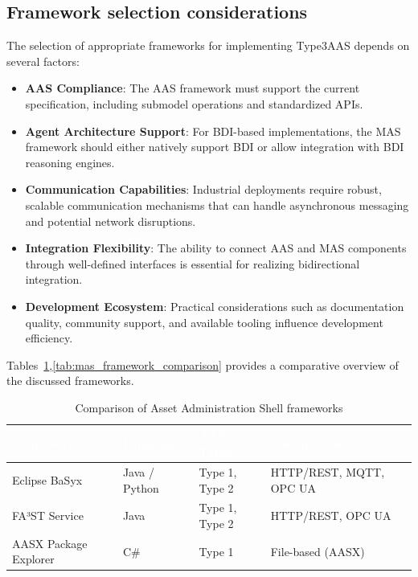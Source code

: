 \subsection{Framework selection considerations}
The selection of appropriate frameworks for implementing \ac{Type3AAS} depends on several factors:

\begin{itemize}
    \item \textbf{AAS Compliance}: The \ac{AAS} framework must support the current specification, including submodel operations and standardized APIs.
    
    \item \textbf{Agent Architecture Support}: For \ac{BDI}-based implementations, the \ac{MAS} framework should either natively support \ac{BDI} or allow integration with \ac{BDI} reasoning engines.
    
    \item \textbf{Communication Capabilities}: Industrial deployments require robust, scalable communication mechanisms that can handle asynchronous messaging and potential network disruptions.
    
    \item \textbf{Integration Flexibility}: The ability to connect \ac{AAS} and \ac{MAS} components through well-defined interfaces is essential for realizing bidirectional integration.
    
    \item \textbf{Development Ecosystem}: Practical considerations such as documentation quality, community support, and available tooling influence development efficiency.
\end{itemize}

Tables~\ref{tab:aas_framework_comparison},\ref{tab:mas_framework_comparison} provides a comparative overview of the discussed frameworks.

\begin{table}[p]
\centering
\caption{Comparison of Asset Administration Shell frameworks}
\label{tab:aas_framework_comparison}
\begin{tabular}{>{\raggedright}p{3.5cm} >{\centering}p{2.5cm} >{\centering}p{3cm} >{\centering\arraybackslash}p{4cm}}
\toprule
\rowcolor{headerblue}
\textcolor{white}{Framework} & \textcolor{white}{Language} & \textcolor{white}{AAS Types} & \textcolor{white}{Communication} \\
\midrule
Eclipse BaSyx & Java / Python & Type 1, Type 2 & HTTP/REST, MQTT, OPC UA \\
\rowcolor{lightgray}
FA³ST Service & Java & Type 1, Type 2 & HTTP/REST, OPC UA \\
AASX Package Explorer & C\# & Type 1 & File-based (AASX) \\
\bottomrule
\end{tabular}
\end{table}

